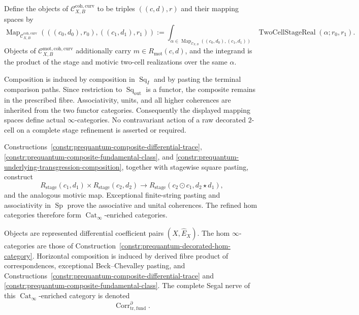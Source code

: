 \begin{construction}
Define the objects of $\mathcal C_{X,B}^{\mathrm{coh,curv}}$ to be triples
$((c,d),r)$ and their mapping spaces by
\[
\boxed{
\operatorname{Map}_{\mathcal C_{X,B}^{\mathrm{coh,curv}}}
(((c_0,d_0),r_0),((c_1,d_1),r_1))
:=
\int_{\alpha\in
\operatorname{Map}_{\mathcal C_{X,B}}
((c_0,d_0),(c_1,d_1))}
\operatorname{TwoCellStageReal}(\alpha;r_0,r_1).
}
\]
Objects of $\mathcal C_{X,B}^{\mathrm{mot,coh,curv}}$ additionally carry
$m\in R_{\mathrm{mot}}(c,d)$, and the integrand is the product of the stage and
motivic two-cell realizations over the same $\alpha$.

Composition is induced by composition in $\operatorname{Sq}_I$ and by pasting
the terminal comparison paths.  Since restriction to
$\operatorname{Sq}_{\mathrm{out}}$ is a functor, the composite remains in the
prescribed fibre.  Associativity, units, and all higher coherences are inherited
from the two functor categories.  Consequently the displayed mapping spaces
define actual $\infty$-categories.  No contravariant action of a raw decorated
$2$-cell on a complete stage refinement is asserted or required.

Constructions~\ref{constr:prequantum-composite-differential-trace},
\ref{constr:prequantum-composite-fundamental-class}, and
\ref{constr:prequantum-underlying-transgression-composition}, together with
stagewise square pasting, construct
\[
R_{\mathrm{stage}}(c_1,d_1)\times R_{\mathrm{stage}}(c_2,d_2)
\longrightarrow
R_{\mathrm{stage}}(c_2\odot c_1,d_2\star d_1),
\]
and the analogous motivic map.  Exceptional finite-string pasting and
associativity in $\operatorname{Sp}$ prove the associative and unital
coherences.  The refined hom categories therefore form
$\operatorname{Cat}_{\infty}$-enriched categories.
\end{construction}

\begin{definition}
\label{def:prequantum-traced-differential-correspondence-category}
Objects are represented differential coefficient pairs
$(X,\widehat E_X)$.  The hom $\infty$-categories are those of
Construction~\ref{constr:prequantum-decorated-hom-category}.  Horizontal
composition is induced by derived fibre product of correspondences, exceptional
Beck--Chevalley pasting, and
Constructions~\ref{constr:prequantum-composite-differential-trace} and
\ref{constr:prequantum-composite-fundamental-class}.  The complete
Segal nerve of this $\operatorname{Cat}_{\infty}$-enriched category is denoted
\[
\operatorname{Corr}^{\partial}_{\mathrm{tr,fund}}.
\]
\end{definition}

